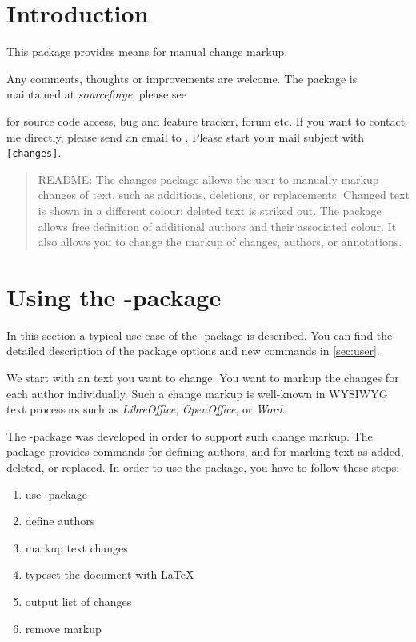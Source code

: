 \section{Introduction}

This package provides means for manual change markup.

Any comments, thoughts or improvements are welcome.
The package is maintained at \emph{sourceforge}, please see



for source code access, bug and feature tracker, forum etc.
If you want to contact me directly, please send an email to .
Please start your mail subject with \texttt{[changes]}.

\begin{quote}
	\small\textsc{README:}
	The changes-package allows the user to manually markup changes of text, such as additions, deletions, or replacements.
	Changed text is shown in a different colour; deleted text is striked out.
	The package allows free definition of additional authors and their associated colour.
	It also allows you to change the markup of changes, authors, or annotations.
\end{quote}


\section{Using the -package}
\label{sec:usage}

In this section a typical use case of the -package is described.
You can find the detailed description of the package options and new commands in \autoref{sec:user}.

We start with an text you want to change.
You want to markup the changes for each author individually.
Such a change markup is well-known in WYSIWYG text processors such as \emph{LibreOffice}, \emph{OpenOffice}, or \emph{Word}.

The -package was developed in order to support such change markup.
The package provides commands for defining authors, and for marking text as added, deleted, or replaced.
In order to use the package, you have to follow these steps:

\begin{enumerate}
	\item use -package
	\item define authors
	\item markup text changes
	\item typeset the document with \LaTeX
	\item output list of changes
	\item remove markup
\end{enumerate}


